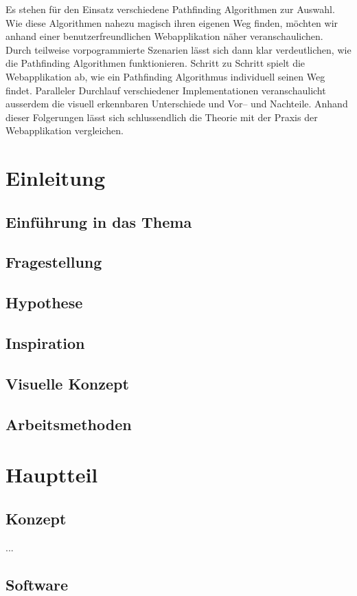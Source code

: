 \documentclass[12pt,a4paper,german]{article}
\begin{document}
Es stehen für den Einsatz verschiedene Pathfinding Algorithmen zur Auswahl. Wie diese Algorithmen nahezu magisch ihren eigenen Weg finden, möchten wir anhand einer benutzerfreundlichen Webapplikation näher veranschaulichen. Durch teilweise vorpogrammierte Szenarien lässt sich dann klar verdeutlichen, wie die Pathfinding Algorithmen funktionieren. Schritt zu Schritt spielt die Webapplikation ab, wie ein Pathfinding Algorithmus individuell seinen Weg findet. Paralleler Durchlauf verschiedener Implementationen veranschaulicht ausserdem die visuell erkennbaren Unterschiede und Vor-- und Nachteile. Anhand dieser Folgerungen lässt sich schlussendlich die Theorie mit der Praxis der Webapplikation vergleichen.
\section{Einleitung}
\subsection{Einführung in das Thema}
\subsection{Fragestellung}
\subsection{Hypothese}
\subsection{Inspiration}
\subsection{Visuelle Konzept}
\subsection{Arbeitsmethoden}

\section{Hauptteil}
\subsection{Konzept}
...
\cite[Kapitel X, p.~123]{cuishi2011}

\subsection{Software}
\end{document}
